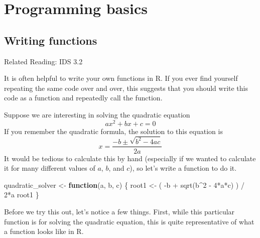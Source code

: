 \documentclass[
  letterpaper,
  DIV=11,
  numbers=noendperiod]{scrreprt}
\newenvironment{Shaded}{\begin{snugshade}}{\end{snugshade}}
\newcommand{\ControlFlowTok}[1]{\textcolor[rgb]{0.00,0.23,0.31}{\textbf{#1}}}
\newcommand{\DecValTok}[1]{\textcolor[rgb]{0.68,0.00,0.00}{#1}}
\newcommand{\FunctionTok}[1]{\textcolor[rgb]{0.28,0.35,0.67}{#1}}
\newcommand{\NormalTok}[1]{\textcolor[rgb]{0.00,0.23,0.31}{#1}}
\newcommand{\OtherTok}[1]{\textcolor[rgb]{0.00,0.23,0.31}{#1}}
\newcommand{\SpecialCharTok}[1]{\textcolor[rgb]{0.37,0.37,0.37}{#1}}
\begin{document}
\section{Programming basics}\label{programming-basics}

\subsection{Writing functions}\label{writing-functions}

Related Reading: IDS 3.2

It is often helpful to write your own functions in R. If you ever find
yourself repeating the same code over and over, this suggests that you
should write this code as a function and repeatedly call the function.

Suppose we are interesting in solving the quadratic equation \[
  ax^2 + bx + c = 0
\] If you remember the quadratic formula, the solution to this equation
is \[
  x = \frac{-b \pm \sqrt{b^2-4ac}}{2a}
\] It would be tedious to calculate this by hand (especially if we
wanted to calculate it for many different values of \(a\), \(b\), and
\(c\)), so let's write a function to do it.

\begin{Shaded}
\begin{Highlighting}[]
\NormalTok{quadratic\_solver }\OtherTok{\textless{}{-}} \ControlFlowTok{function}\NormalTok{(a, b, c) \{}
\NormalTok{  root1 }\OtherTok{\textless{}{-}}\NormalTok{ ( }\SpecialCharTok{{-}}\NormalTok{b }\SpecialCharTok{+} \FunctionTok{sqrt}\NormalTok{(b}\SpecialCharTok{\^{}}\DecValTok{2} \SpecialCharTok{{-}} \DecValTok{4}\SpecialCharTok{*}\NormalTok{a}\SpecialCharTok{*}\NormalTok{c) ) }\SpecialCharTok{/} \DecValTok{2}\SpecialCharTok{*}\NormalTok{a}
\NormalTok{  root1}
\NormalTok{\}}
\end{Highlighting}
\end{Shaded}

Before we try this out, let's notice a few things. First, while this
particular function is for solving the quadratic equation, this is quite
representative of what a function looks like in R.
\end{document}
